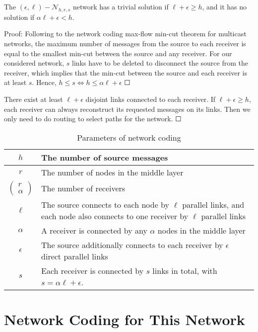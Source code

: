 \begin{thm}
\label{nw_parameters}The $(\epsilon,\ell)-\mathcal{N}_{h,r,s}$
network has a trivial solution if $\ell+\epsilon\geq h$, and it has
no solution if $\alpha\ell+\epsilon<h$. 

Proof: Following to the network coding max-flow min-cut theorem for
multicast networks, the maximum number of messages from the source
to each receiver is equal to the smallest min-cut between the source
and any receiver. For our considered network, $s$ links have to be
deleted to disconnect the source from the receiver, which implies
that the min-cut between the source and each receiver is at least
$s$. Hence, $h\leq s\Leftrightarrow h\leq\alpha\ell+\epsilon$ $\Square$

There exist at least $\ell+\epsilon$ disjoint links connected to
each receiver. If $\ell+\epsilon\geq h$, each receiver can always
reconstruct its requested messages on its links. Then we only need
to do routing to select paths for the network. $\Square$
\end{thm}
\begin{table}[H]
\caption{Parameters of network coding \label{tab:Parameters-of-network}}

\centering{}%
\begin{tabular}{c|>{\centering}p{0.48\paperwidth}}
$h$ & The number of source messages\tabularnewline
\hline 
$r$ & The number of nodes in the middle layer\tabularnewline
\hline 
$\left(\begin{array}{c}
r\\
\alpha
\end{array}\right)$ & The number of receivers\tabularnewline
\hline 
$\ell$ & The source connects to each node by $\ell$ parallel links, and each
node also connects to one receiver by $\ell$ parallel links\tabularnewline
\hline 
$\alpha$ & A receiver is connected by any $\alpha$ nodes in the middle layer\tabularnewline
\hline 
$\epsilon$ & The source additionally connects to each receiver by $\epsilon$ direct
parallel links\tabularnewline
\hline 
$s$ & Each receiver is connected by $s$ links in total, with $s=\alpha\ell+\epsilon$.\tabularnewline
\end{tabular}
\end{table}


\section{Network Coding for This Network}

